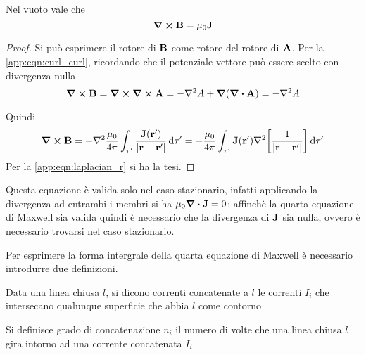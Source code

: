 \begin{thm}
    Nel vuoto vale che
    \begin{equation}
        \curl{\vb{B}}=\mu_0\vb{J}
    \end{equation}
\end{thm}
\begin{proof}
    Si può esprimere il rotore di $\vb{B}$ come rotore del rotore di $\vb{A}$. Per la \eqref{app:eqn:curl_curl},
    ricordando che il potenziale vettore può essere scelto con divergenza nulla
    \[
        \curl{\vb{B}}=\curl\curl{\vb{A}}=-\laplacian{A}+\grad(\div{\vb{A}})=-\laplacian{A}
    \]

    Quindi
    \[
        \curl{\vb{B}}=-\laplacian{\frac{\mu_0}{4\pi}\int_{\tau'} \frac{\vb{J}(\vb{r}')}{\abs{\vb{r}-\vb{r}'}}}\dd{\tau'}=
        -\frac{\mu_0}{4\pi}\int_{\tau'} \vb{J}(\vb{r}')\laplacian[\rec{\abs{\vb{r}-\vb{r}'}}]\dd{\tau'}
    \]
    Per la \eqref{app:eqn:laplacian_r} si ha la tesi.

\end{proof}
Questa equazione è valida solo nel caso stazionario, infatti applicando la divergenza ad entrambi i membri si ha $\mu_0\div{\vb{J}}=0$:
affinchè la quarta equazione di Maxwell sia valida quindi è necessario che la divergenza di $\vb{J}$ sia nulla, ovvero
è necessario trovarsi nel caso stazionario.

Per esprimere la forma intergrale della quarta equazione di Maxwell è necessario introdurre due definizioni.
\begin{defn}
    Data una linea chiusa $l$, si dicono correnti concatenate a $l$ le correnti $I_i$ che intersecano qualunque superficie che abbia $l$ come contorno
\end{defn}
\begin{defn}
    Si definisce grado di concatenazione $n_i$ il numero di volte che una linea chiusa $l$ gira intorno ad una corrente concatenata $I_i$
\end{defn}

